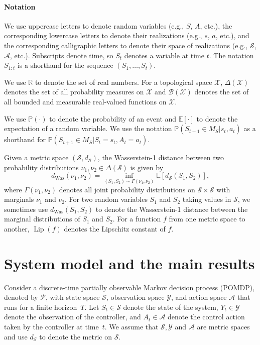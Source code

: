 \documentclass[letterpaper, 10pt]{IEEEtran}
\theoremstyle{plain}
\theoremstyle{nonumberplain}
\theoremstyle{plain}
\newcommand*\ALPHABET{\mathcal}
\newcommand*\B[1]{\ALPHABET B(\ALPHABET #1)}
\newcommand*\PR{\mathds{P}}
\newcommand*\EXP{\mathds{E}}
\newcommand*\reals{\mathds{R}}
\newcommand\dWas{d_{\mathrm{Was}}}
\newcommand\dS{d_{\ALPHABET S}}
\DeclareMathOperator{\Lip}{Lip}
\begin{document}
\paragraph*{Notation} We use uppercase letters to denote random variables (e.g., $S$, $A$, etc.), the corresponding lowercase letters to denote their realizations (e.g., $s$, $a$, etc.), and the corresponding calligraphic letters to denote their space of realizations (e.g., $\ALPHABET S$, $\ALPHABET A$, etc.). Subscripts denote time, so $S_t$ denotes a variable at time $t$. The notation $S_{1:t}$ is a shorthand for the sequence $(S_1, \dots, S_t)$. 

We use $\reals$ to denote the set of real numbers. For a topological space $\ALPHABET X$, $\Delta(\ALPHABET X)$ denotes the set of all probability measures on $\ALPHABET X$ and $\B{X}$ denotes the set of all bounded and measurable real-valued functions on $\ALPHABET X$. 

We use $\PR(\cdot)$ to denote the probability of an event and $\EXP[\cdot]$ to denote the expectation of a random variable. We use the notation $\PR(S_{t+1} \in M_S | s_t, a_t)$ as a shorthand for $\PR(S_{t+1} \in M_S | S_{t} = s_t, A_t = a_t)$. 

Given a metric space $(\ALPHABET S, \dS)$, the Wasserstein-1 distance between two probability distributions $\nu_1, \nu_2 \in \Delta(\ALPHABET S)$ is given by
\[
   \dWas(\nu_1,\nu_2) = \inf_{(S_1, S_2) \sim \Gamma(\nu_1, \nu_2)}\EXP[\dS(S_1, S_2)],
\]
where $\Gamma(\nu_1, \nu_2)$ denotes all joint probability distributions on $\ALPHABET S \times \ALPHABET S$ with marginals $\nu_1$ and $\nu_2$. For two  random variables $S_1$ and $S_2$ taking values in $\ALPHABET S$, we sometimes use $\dWas(S_1, S_2)$ to denote the Wasserstein-1 distance between the marginal distributions of $S_1$ and $S_2$. For a function $f$ from one metric space to another, $\Lip(f)$ denotes the Lipschitz constant of $f$.

\section{System model and the main results}\label{sec:system_model}

Consider a discrete-time partially observable Markov decision process (POMDP), denoted by $\ALPHABET P$, with state space $\ALPHABET S$, observation space $\ALPHABET Y$, and action space $\ALPHABET A$ that runs for a finite horizon~$T$. Let $S_t \in \ALPHABET S$ denote the state of the system, $Y_t \in \ALPHABET Y$ denote the observation of the controller, and $A_t \in \ALPHABET A$ denote the control action taken by the controller at time~$t$. We assume that $\ALPHABET S, \ALPHABET Y$ and $\ALPHABET A$ are metric spaces and use $\dS$ to denote the metric on $\ALPHABET S$.
\end{document}

